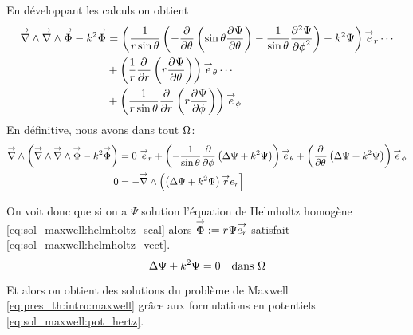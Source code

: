 %
En développant les calculs on obtient
\begin{align*}
  \vrot \vrot \vect \Phi - k^2 \vect \Phi
  &= \left(\frac{1}{r\sin\theta}\left(-\ddr{\theta}{}\left(\sin\theta\ddr{\theta}{\Psi}\right)-\frac{1}{\sin\theta}\ddr[2]{\phi}{\Psi}\right)-k^2\Psi\right)\vect e_r \cdots \\
  &+ \left(\frac{1}{r}\ddr{r}{}\left(r\ddr{\theta}{\Psi}\right)\right)\vect e_\theta \cdots \\
  &+ \left(\frac{1}{r\sin\theta}\ddr{r}{}\left(r\ddr{\phi}{\Psi}\right)\right)\vect e_\phi
\end{align*}
En définitive, nous avons dans tout \(\OO\):
\begin{align*}
  \vrot\left(\vrot \vrot \vect \Phi - k^2 \vect \Phi\right)
  &= %
   0 ~ \vect e_r
  + \left(-\frac{1}{\sin\theta}\ddr{\phi}{}\left(\Delta \Psi + k^2 \Psi \right)\right)\vect e_\theta
  + \left(\ddr{\theta}{}\left(\Delta \Psi + k^2 \Psi \right)\right)\vect e_\phi \\
  0 &= -\vrot \left( \left(\Delta \Psi + k^2\Psi\right)\vect r e_r\right]
\end{align*}

On voit donc que si on a \(\Psi\) solution l'équation de Helmholtz homogène  \eqref{eq:sol_maxwell:helmholtz_scal} alors  \(\vect \Phi:=r\Psi\vect{e_r}\) satisfait \eqref{eq:sol_maxwell:helmholtz_vect}.
\begin{equation}
  \label{eq:sol_maxwell:helmholtz_scal}
   \Delta \Psi + k^2\Psi = 0 \quad \text{dans \(\OO\)}
\end{equation}

Et alors on obtient des solutions du problème de Maxwell \eqref{eq:pres_th:intro:maxwell} grâce aux formulations en potentiels \eqref{eq:sol_maxwell:pot_hertz}.
